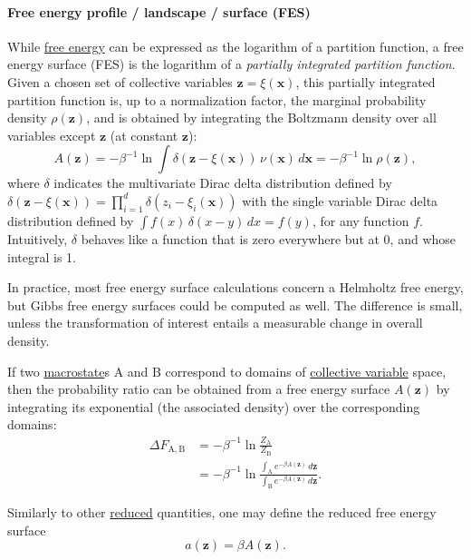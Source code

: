 \documentclass[9pt,review]{livecoms}
\newcommand{\vx}{\mathbf{x}}
\newcommand{\vz}{\mathbf{z}}
\newcommand{\A}{\mathrm{A}}
\newcommand{\B}{\mathrm{B}}
\begin{document}
\hypertarget{ref:FES} {\paragraph{Free energy profile / landscape / surface (FES)}}
\label{sec:FES}
While \hyperlink{ref:FE} {free energy} can be expressed as the logarithm of a partition function, a free energy surface (FES) is the logarithm of a \textit{partially integrated partition function}.
Given a chosen set of collective variables $\vz = \xi(\vx)$, this partially integrated partition function is, up to a normalization factor, the marginal probability density $\rho(\vz)$, and is obtained by integrating the Boltzmann density over all variables except $\vz$ (at constant $\vz$):
\begin{equation}
\label{eq:fes_definition}
    A(\vz) = -\beta^{-1} \ln \int
    \delta\left(\vz-\xi(\vx)\right) \, \nu(\vx)\, d\vx
    = -\beta^{-1} \ln \rho(\vz) ,
\end{equation}
where $\delta$ indicates the multivariate Dirac delta distribution defined by $\delta\left(\vz-\xi(\vx)\right)= \prod_{i=1}^{d} \delta\left(z_i-\xi_i(\vx)\right)$ with the single variable Dirac delta distribution defined by $\int f(x) \, \delta(x-y) \,  dx = f(y)$, for any function $f$. Intuitively, $\delta$ behaves like a function that is zero everywhere but at 0, and whose integral is 1.

In practice, most free energy surface calculations concern a Helmholtz free energy, but Gibbs free energy surfaces could be computed as well. The difference is small, unless the transformation of interest entails a measurable change in overall density.

If two \hyperlink{ref:Macrostate} {macrostate}s $\A$ and $\B$ correspond to domains of \hyperlink{ref:CV} {collective variable} space, then the probability ratio can be obtained from a free energy surface $A(\vz)$ by integrating its exponential (the associated density) over the corresponding domains:
\begin{align}
  \Delta F_{\A,\B} &=
  -\beta^{-1} \ln \frac{Z_\A}{Z_\B}
  \nonumber \\
  & =  -\beta^{-1} \ln
  \frac{\int_\A e^{-\beta A(\vz)} \, d\vz}
  {\int_\B e^{-\beta A(\vz)} \, d\vz}.
\end{align}

Similarly to other \hyperlink{ref:reduced} {reduced} quantities, one may define the reduced free energy surface
\begin{equation}
    a(\vz) = \beta A(\vz).
\end{equation}
\end{document}
